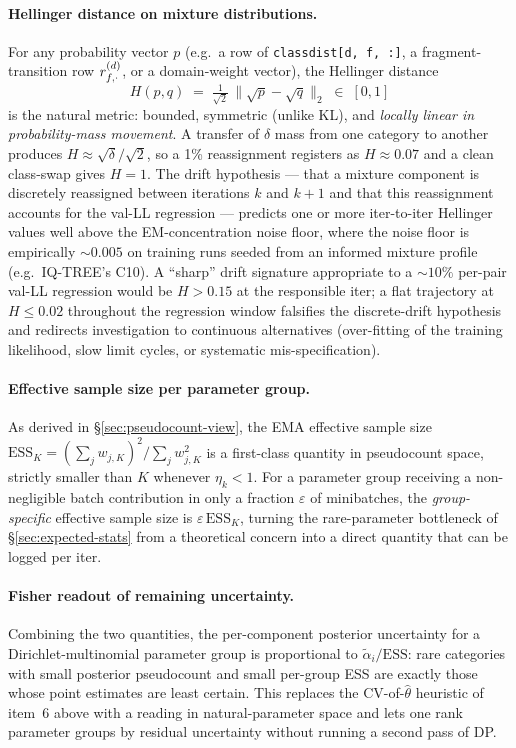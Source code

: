 \paragraph{Hellinger distance on mixture distributions.}
For any probability vector $p$ (e.g.\ a row of \texttt{classdist[d, f, :]},
a fragment-transition row $r^{(d)}_{f,\cdot}$, or a domain-weight
vector), the Hellinger distance
\[
  H(p, q) \;=\; \tfrac{1}{\sqrt{2}}\,\|\sqrt{p} - \sqrt{q}\|_2
  \;\in\; [0, 1]
\]
is the natural metric: bounded, symmetric (unlike KL), and
\emph{locally linear in probability-mass movement}.  A transfer of $\delta$
mass from one category to another produces $H \approx \sqrt{\delta}/\sqrt{2}$,
so a 1\% reassignment registers as $H \approx 0.07$ and a clean
class-swap gives $H = 1$.  The drift hypothesis --- that a mixture
component is discretely reassigned between iterations $k$ and $k{+}1$
and that this reassignment accounts for the val-LL regression --- predicts
one or more iter-to-iter Hellinger values well above the EM-concentration
noise floor, where the noise floor is empirically $\sim 0.005$ on
training runs seeded from an informed mixture profile (e.g.\ IQ-TREE's
C10).  A ``sharp'' drift signature appropriate to a $\sim 10\%$ per-pair
val-LL regression would be $H > 0.15$ at the responsible iter; a flat
trajectory at $H \leq 0.02$ throughout the regression window falsifies
the discrete-drift hypothesis and redirects investigation to continuous
alternatives (over-fitting of the training likelihood, slow limit
cycles, or systematic mis-specification).

\paragraph{Effective sample size per parameter group.}
As derived in \S\ref{sec:pseudocount-view}, the EMA effective sample
size $\mathrm{ESS}_K = (\sum_j w_{j,K})^2 / \sum_j w_{j,K}^2$ is a first-class
quantity in pseudocount space, strictly smaller than $K$ whenever
$\eta_k < 1$.  For a parameter group receiving a non-negligible batch
contribution in only a fraction $\varepsilon$ of minibatches, the
\emph{group-specific} effective sample size is $\varepsilon\,\mathrm{ESS}_K$,
turning the rare-parameter bottleneck of \S\ref{sec:expected-stats} from
a theoretical concern into a direct quantity that can be logged per iter.

\paragraph{Fisher readout of remaining uncertainty.}
Combining the two quantities, the per-component posterior uncertainty
for a Dirichlet-multinomial parameter group is proportional to
$\tilde{\alpha}_i / \mathrm{ESS}$: rare categories with small posterior
pseudocount and small per-group ESS are exactly those whose point
estimates are least certain.  This replaces the CV-of-$\hat\theta$
heuristic of item~6 above with a reading in natural-parameter space
and lets one rank parameter groups by residual uncertainty without
running a second pass of DP.


